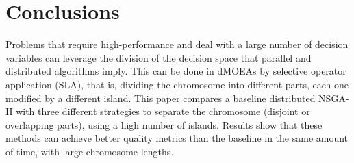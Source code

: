 \documentclass[preprint]{elsarticle}
\begin{document}






\section{Conclusions}

Problems that require high-performance %
 and deal with a large number of decision variables can leverage the
 division of the decision space that parallel and distributed
 algorithms imply. This can be done in dMOEAs by selective operator application (SLA), that is, dividing the
 chromosome into different parts, each one modified by a different
 island. This paper compares a baseline distributed NSGA-II with three
 different strategies to separate the chromosome (disjoint or
 overlapping parts), using a high number of islands. Results show that
 these methods can achieve better quality metrics than the baseline in
 the same amount of time, with large chromosome lengths. 
\end{document}
